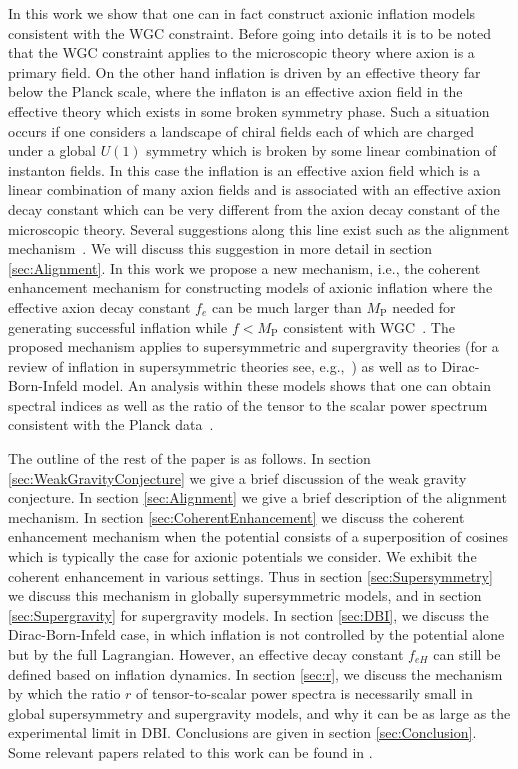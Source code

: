 \documentclass[11pt]{article}
\begin{document}
In this work we show that one can in fact construct axionic inflation models consistent with the WGC constraint.
Before going into details it is to be noted that the WGC constraint applies to the microscopic theory where axion is a primary field.
On the other hand inflation is driven by an effective theory far below the Planck scale, where the inflaton is an effective axion field in the effective theory which exists in some broken symmetry phase.
Such a situation occurs if one considers a landscape of chiral fields each of which are charged under a global $U\left(1\right)$ symmetry which is broken by some linear combination of instanton fields.
In this case the inflation is an effective axion field which is a linear combination of many axion fields and is associated with an effective axion decay constant which can be very different from the axion decay constant of the microscopic theory.
Several suggestions along this line exist such as the alignment mechanism~\cite{Kim:2004rp, Long:2014dta}.
We will discuss this suggestion in more detail in section \ref{sec:Alignment}.
In this work we propose a new mechanism, i.e., the coherent enhancement mechanism for constructing models of axionic inflation where the effective axion decay constant $f_e$ can be much larger than $M_\text{P}$ needed for generating successful inflation while $f < M_\text{P}$ consistent with WGC~\cite{Nath:2017ihp}.
The proposed mechanism applies to supersymmetric and supergravity theories (for a review of inflation in supersymmetric theories see, e.g.,~\cite{Nath:2016qzm}) as well as to Dirac-Born-Infeld model.
An analysis within these models shows that one can obtain spectral indices as well as the ratio of the tensor to the scalar power spectrum consistent with the Planck data~\cite{Akrami:2018vks, Akrami:2018odb, Array:2015xqh}.

The outline of the rest of the paper is as follows.
In section \ref{sec:WeakGravityConjecture} we give a brief discussion of the weak gravity conjecture.
In section \ref{sec:Alignment} we give a brief description of the alignment mechanism.
In section \ref{sec:CoherentEnhancement} we discuss the coherent enhancement mechanism when the potential consists of a superposition of cosines which is typically the case for axionic potentials we consider.
We exhibit the coherent enhancement in various settings.
Thus in section \ref{sec:Supersymmetry} we discuss this mechanism in globally supersymmetric models, and in section \ref{sec:Supergravity} for supergravity models.
In section \ref{sec:DBI}, we discuss the Dirac-Born-Infeld case, in which inflation is not controlled by the potential alone but by the full Lagrangian.
However, an effective decay constant $f_{eH}$ can still be defined based on inflation dynamics.
In section \ref{sec:r}, we discuss the mechanism by which the ratio $r$ of tensor-to-scalar power spectra is necessarily small in global supersymmetry and supergravity models, and why it can be as large as the experimental limit in DBI.
Conclusions are given in section \ref{sec:Conclusion}.
Some relevant papers related to this work can be found in \cite{BlancoPillado:2006he, Conlon:2005jm, Ben-Dayan:2014lca, Gao:2014uha}.
\end{document}
